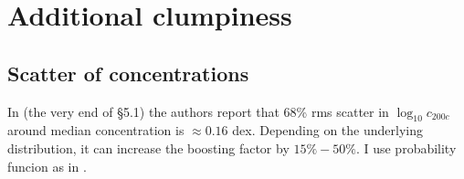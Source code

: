 
\section{Additional clumpiness}
\subsection{Scatter of concentrations}
In \cite{2014arXiv1407.4730D} (the very end of \S5.1) the authors report that 68\% rms scatter in $\log_{10}c_{200c}$ around median concentration is $\approx 0.16$ dex. Depending on the underlying distribution, it can increase the boosting factor by $15\%-50\%$. I use probability funcion as in \cite{2014arXiv1412.4308M}.
